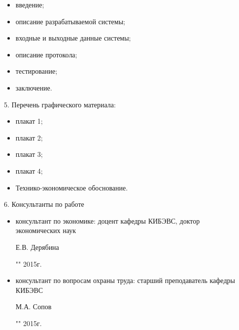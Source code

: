 \begin{itemize}
 \item введение;
 \item описание разрабатываемой системы;
 \item входные и выходные данные системы;
 \item описание протокола;
 \item тестирование;
 \item заключение.
\end{itemize}

5. Перечень графического материала:

\begin{itemize}
 \item плакат 1;
 \item плакат 2;
 \item плакат 3;
 \item плакат 4;
 \item Технико-экономическое обоснование.
\end{itemize}

6. Консультанты по работе

\begin{itemize}
 \item консультант по экономике: доцент кафедры КИБЭВС, доктор \\ экономических наук \\
 \begin{singlespace}
 Е.В. Дерябина \hfill \underline{\hspace{6cm}} \\
 \begin{flushright} "\underline{\hspace{1cm}}"\underline{\hspace{3cm}} 2015г. \end{flushright}
 \end{singlespace}
 \item консультант по вопросам охраны труда: старший преподаватель кафедры КИБЭВС\\
 \begin{singlespace}
 М.А. Сопов \hfill \underline{\hspace{6cm}} \\
 \begin{flushright} "\underline{\hspace{1cm}}"\underline{\hspace{3cm}} 2015г. \end{flushright}
 \end{singlespace}
\end{itemize}

